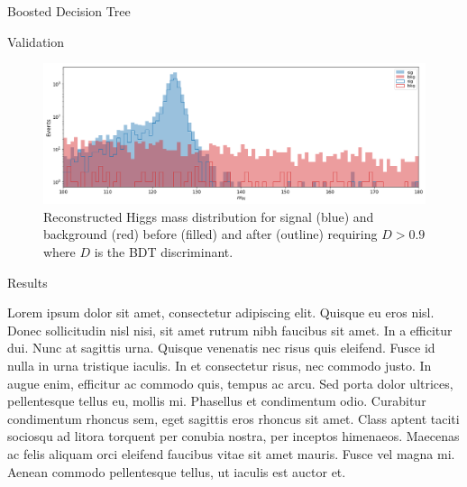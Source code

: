 \begin{section}{Boosted Decision Tree}
\begin{subsection}{Validation}
\begin{figure}[htb]
\begin{center}
\includegraphics[width=.95\linewidth]{Dissertation/fig/bdt-bkgsculpt2.png}
\end{center}
\caption{Reconstructed Higgs mass distribution for signal (blue) and background (red) before (filled) and after (outline) requiring $D > 0.9$ where $D$ is the BDT discriminant.}
\label{fig:bdt-bkgsculpt2}
\end{figure}
\end{subsection}
\end{section}

\begin{section}{Results}

Lorem ipsum dolor sit amet, consectetur adipiscing elit. Quisque eu eros nisl. Donec sollicitudin nisl nisi, sit amet rutrum nibh faucibus sit amet. In a efficitur dui. Nunc at sagittis urna. Quisque venenatis nec risus quis eleifend. Fusce id nulla in urna tristique iaculis. In et consectetur risus, nec commodo justo. In augue enim, efficitur ac commodo quis, tempus ac arcu. Sed porta dolor ultrices, pellentesque tellus eu, mollis mi. Phasellus et condimentum odio. Curabitur condimentum rhoncus sem, eget sagittis eros rhoncus sit amet. Class aptent taciti sociosqu ad litora torquent per conubia nostra, per inceptos himenaeos. Maecenas ac felis aliquam orci eleifend faucibus vitae sit amet mauris. Fusce vel magna mi. Aenean commodo pellentesque tellus, ut iaculis est auctor et.

\end{section}